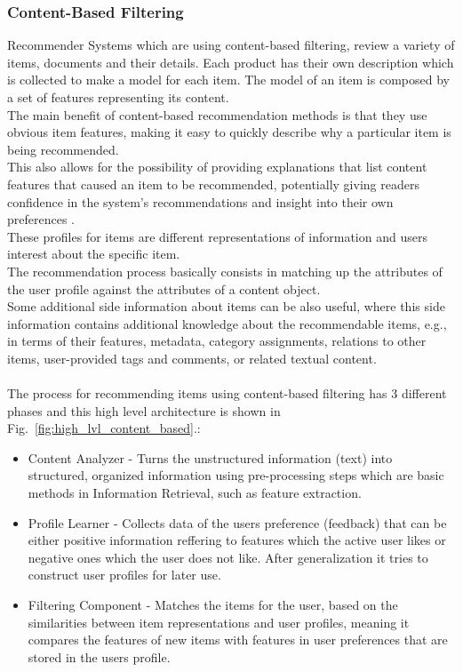 \documentclass[\myFontSize,a4paper,oneside,hidelinks]{article}
\begin{document}
\subsubsection{Content-Based Filtering}
Recommender Systems which are using content-based filtering, review a variety of items, documents and their details. Each product has their own description which is collected to make a model for each item. The model of an item is composed by a set of features representing its content. \\
The main benefit of content-based recommendation methods is that they use obvious item features, making it easy to quickly describe why a particular item is being recommended. \cite{pub.1034486657}\\
This also allows for the possibility of providing explanations that list content features that caused an item to be recommended, potentially giving readers confidence in the system’s recommendations and insight into their own preferences \cite{Mooney2000195}. \\
These profiles for items are different representations of information and users interest about the specific item. \\
The recommendation process basically consists in matching up the attributes of the user profile against the attributes of a content object. \cite{pub.1034486657}\\
%
%
Some additional side information about items can be also useful, where this side information contains additional knowledge about the recommendable items, e.g., in terms of their features, metadata, category assignments, relations to other items, user-provided tags and comments, or related textual content. \cite{Lops2019239}\\\\
The process for recommending items using content-based filtering has 3 different phases and this high level architecture is shown in Fig.~\ref{fig:high_lvl_content_based}.:
\begin{itemize}
\item Content Analyzer - Turns the unstructured information (text) into structured, organized information using pre-processing steps which are basic methods in Information Retrieval, such as feature extraction.
\item Profile Learner - Collects data of the users preference (feedback) that can be either positive information reffering to features which the active user likes or negative ones which the user does not like. After generalization it tries to construct user profiles for later use.
\item Filtering Component - Matches the items for the user, based on the similarities between item representations and user profiles, meaning it compares the features of new items with features in user preferences that are stored in the users profile. \cite{pub.1034486657}
\end{itemize}
%
\end{document}
